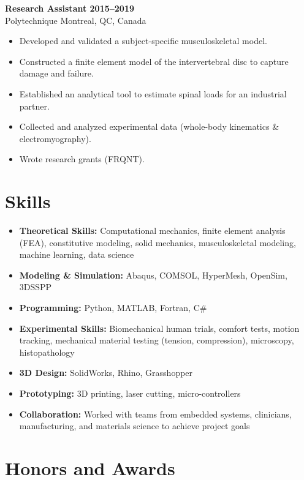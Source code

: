 \documentclass[11pt,a4paper]{article}
\begin{document}
\textbf{Research Assistant \hfill 2015--2019} \\
Polytechnique Montreal, QC, Canada
\begin{itemize}[leftmargin=*, label={}]
    \item Developed and validated a subject-specific musculoskeletal model.
    \item Constructed a finite element model of the intervertebral disc to capture damage and failure.
    \item Established an analytical tool to estimate spinal loads for an industrial partner.
    \item Collected and analyzed experimental data (whole-body kinematics \& electromyography).
    \item Wrote research grants (FRQNT).
\end{itemize}

\section*{Skills}

\begin{itemize}[leftmargin=*, label={}]
    \item \textbf{Theoretical Skills:} Computational mechanics, finite element analysis (FEA), constitutive modeling, solid mechanics, musculoskeletal modeling, machine learning, data science
    \item \textbf{Modeling \& Simulation:} Abaqus, COMSOL, HyperMesh, OpenSim, 3DSSPP
    \item \textbf{Programming:} Python, MATLAB, Fortran, C\#
    \item \textbf{Experimental Skills:} Biomechanical human trials, comfort tests, motion tracking, mechanical material testing (tension, compression), microscopy, histopathology
    \item \textbf{3D Design:} SolidWorks, Rhino, Grasshopper
    \item \textbf{Prototyping:} 3D printing, laser cutting, micro-controllers
    \item \textbf{Collaboration:} Worked with teams from embedded systems, clinicians, manufacturing, and materials science to achieve project goals
\end{itemize}

\section*{Honors and Awards}
\end{document}
